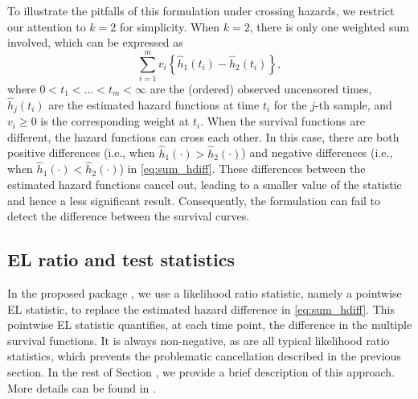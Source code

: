 To illustrate the pitfalls of this formulation under crossing hazards, we restrict our attention to $k=2$ for simplicity. %
When $k=2$, there is only one weighted sum involved, which can be expressed as
\begin{equation} 
\label{eq:sum_hdiff}
\sum_{i=1}^m v_{i} \left\{\hat{h}_1\left(t_i\right)-\hat{h}_2\left(t_i\right)\right\},
\end{equation}
where $0<t_1<\ldots<t_m<\infty$ are the (ordered) observed uncensored times, $\hat{h}_j(t_i)$ are the estimated hazard functions at time $t_i$ for the $j$-th sample, and $v_{i} \ge 0$ is the corresponding weight at $t_i$.
When the survival functions are different, %
the hazard functions can cross each other. %
In this case, there are both positive differences (i.e., when $\hat{h}_1(\cdot)>\hat{h}_2(\cdot)$) and negative differences (i.e., when $\hat{h}_1(\cdot)<\hat{h}_2(\cdot)$) in \eqref{eq:sum_hdiff}. %
These differences between the estimated hazard functions cancel out, %
leading to a smaller value of the statistic and hence a less significant result. Consequently, the formulation can fail to detect the difference between the survival curves. %

\subsection{EL ratio and test statistics} \label{sec:overview} 

In the proposed package , we use a likelihood ratio statistic, namely a pointwise EL statistic, to replace the estimated hazard difference  in \eqref{eq:sum_hdiff}. This pointwise EL statistic quantifies, at each time point, the difference in the multiple survival functions. %
It is always non-negative, as are all typical likelihood ratio statistics, which prevents the problematic cancellation described in the previous section. In the rest of Section , we provide a brief description of this approach. More details can be found in \citet{CM:2016, CM:2019}.


